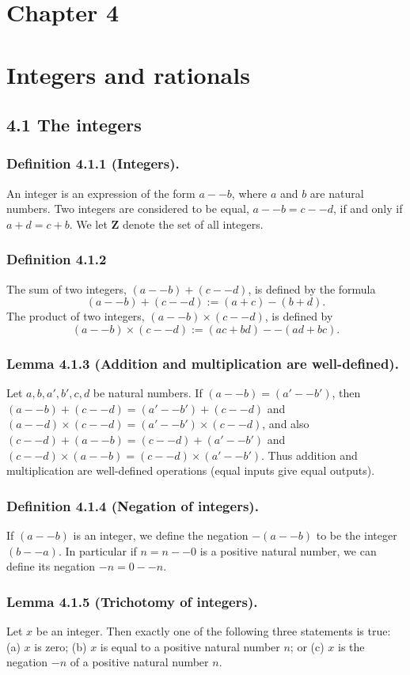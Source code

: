 \documentclass[12pt, letter]{article}
\begin{document}
\section*{Chapter 4}
\section*{Integers and rationals}
\subsection*{4.1 The integers}
\subsubsection*{Definition 4.1.1 (Integers).}
An integer is an expression of the form $a--b$, where $a$ and $b$ are natural numbers. Two integers are considered to be equal, 
$a--b=c--d$, if and only if $a+d=c+b$. We let $\mathbf{Z}$ denote the set of all integers.
\subsubsection*{Definition 4.1.2}
The sum of two integers, $(a--b)+(c--d)$, is defined by the formula
\begin{equation*}
    (a--b)+(c--d):=(a+c)-(b+d).
\end{equation*}
The product of two integers, $(a--b)\times (c--d)$, is defined by
\begin{equation*}
    (a--b)\times(c--d):=(ac+bd)--(ad+bc).
\end{equation*}
\subsubsection*{Lemma 4.1.3 (Addition and multiplication are well-defined).}
Let $a,b,a',b',c,d$ be natural numbers. If $(a--b)=(a'--b')$, then $(a--b)+(c--d)=(a'--b')+(c--d)$ and 
$(a--d)\times(c--d)=(a'--b')\times(c--d)$, and also $(c--d)+(a--b)=(c--d)+(a'--b')$ and $(c--d)\times(a--b)=(c--d)\times(a'--b')$.
Thus addition and multiplication are well-defined operations (equal inputs give equal outputs).
\subsubsection*{Definition 4.1.4 (Negation of integers).}
If $(a--b)$ is an integer, we define the negation $-(a--b)$ to be the integer $(b--a)$. In particular if $n=n--0$
is a positive natural number, we can define its negation $-n=0--n$.
\subsubsection*{Lemma 4.1.5 (Trichotomy of integers).}
Let $x$ be an integer. Then exactly one of the following three statements is true: (a) $x$ is zero;
(b) $x$ is equal to a positive natural number $n$; or (c) $x$ is the negation $-n$ of a positive natural number $n$.
\end{document}
